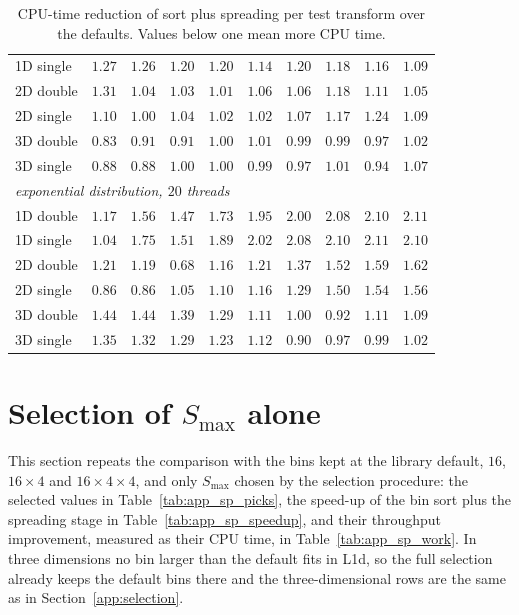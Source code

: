 \begin{table}[p]
\begin{tabular}{lrrrrrrrrr}
        1D single & $1.27$ & $1.26$ & $1.20$ & $1.20$ & $1.14$ & $1.20$ & $1.18$ & $1.16$ & $1.09$ \\
        2D double & $1.31$ & $1.04$ & $1.03$ & $1.01$ & $1.06$ & $1.06$ & $1.18$ & $1.11$ & $1.05$ \\
        2D single & $1.10$ & $1.00$ & $1.04$ & $1.02$ & $1.02$ & $1.07$ & $1.17$ & $1.24$ & $1.09$ \\
        3D double & $0.83$ & $0.91$ & $0.91$ & $1.00$ & $1.01$ & $0.99$ & $0.99$ & $0.97$ & $1.02$ \\
        3D single & $0.88$ & $0.88$ & $1.00$ & $1.00$ & $0.99$ & $0.97$ & $1.01$ & $0.94$ & $1.07$ \\
        \midrule
        \multicolumn{10}{l}{\emph{exponential distribution, $20$ threads}} \\
        1D double & $1.17$ & $1.56$ & $1.47$ & $1.73$ & $1.95$ & $2.00$ & $2.08$ & $2.10$ & $2.11$ \\
        1D single & $1.04$ & $1.75$ & $1.51$ & $1.89$ & $2.02$ & $2.08$ & $2.10$ & $2.11$ & $2.10$ \\
        2D double & $1.21$ & $1.19$ & $0.68$ & $1.16$ & $1.21$ & $1.37$ & $1.52$ & $1.59$ & $1.62$ \\
        2D single & $0.86$ & $0.86$ & $1.05$ & $1.10$ & $1.16$ & $1.29$ & $1.50$ & $1.54$ & $1.56$ \\
        3D double & $1.44$ & $1.44$ & $1.39$ & $1.29$ & $1.11$ & $1.00$ & $0.92$ & $1.11$ & $1.09$ \\
        3D single & $1.35$ & $1.32$ & $1.29$ & $1.23$ & $1.12$ & $0.90$ & $0.97$ & $0.99$ & $1.02$ \\
        \bottomrule
    \end{tabular}
    \caption{CPU-time reduction of sort plus spreading per test transform over the defaults. Values below one mean more CPU time.}
    \label{tab:app_selection_work}
\end{table}

\section{Selection of \texorpdfstring{$S_{\max}$}{Smax} alone}
\label{app:selection_sp}

This section repeats the comparison with the bins kept at the library default, $16$, $16 \times 4$ and $16 \times 4 \times 4$, and only $S_{\max}$ chosen by the selection procedure: the selected values in Table~\ref{tab:app_sp_picks}, the speed-up of the bin sort plus the spreading stage in Table~\ref{tab:app_sp_speedup}, and their throughput improvement, measured as their CPU time, in Table~\ref{tab:app_sp_work}. In three dimensions no bin larger than the default fits in L1d, so the full selection already keeps the default bins there and the three-dimensional rows are the same as in Section~\ref{app:selection}.

